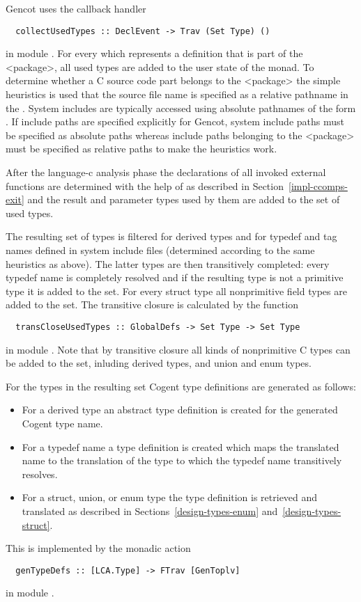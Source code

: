 Gencot uses the callback handler
\begin{verbatim}
  collectUsedTypes :: DeclEvent -> Trav (Set Type) ()
\end{verbatim}
in module . For every  which represents a definition that is
part of the <package>, all used types are added to the user state of the  monad. To determine whether
a C source code part belongs to the <package> the simple heuristics is used that the source file name is specified
as a relative pathname in the . System includes are typically accessed using absolute pathnames of the 
form . If include paths are specified explicitly for Gencot, system include paths must be 
specified as absolute paths whereas include paths belonging to the <package> must be specified as relative paths
to make the heuristics work.

After the language-c analysis phase the declarations of all invoked external functions are determined with the
help of  as described in Section~\ref{impl-ccomps-exit} and the result and parameter 
types used by them are added to the set of used types.

The resulting set of types is filtered for derived types and for typedef and tag names defined in system include files
(determined according to the same heuristics as above). The latter types are then transitively completed: every typedef 
name is completely resolved and if the resulting type is not a primitive type it is added to the set. For every struct
type all nonprimitive field types are added to the set. The transitive closure is calculated by the function
\begin{verbatim}
  transCloseUsedTypes :: GlobalDefs -> Set Type -> Set Type
\end{verbatim}
in module . Note that by transitive closure all kinds of nonprimitive C types can be added to
the set, inluding derived types, and union and enum types.

For the types in the resulting set Cogent type definitions are generated as follows:
\begin{itemize}
\item For a derived type an abstract type definition is created for the generated Cogent type name.
\item For a typedef name a type definition is created which maps the translated name to the translation of the type
to which the typedef name transitively resolves.
\item For a struct, union, or enum type the type definition is retrieved and translated as described in 
Sections~\ref{design-types-enum} and~\ref{design-types-struct}.
\end{itemize}
This is implemented by the monadic action
\begin{verbatim}
  genTypeDefs :: [LCA.Type] -> FTrav [GenToplv]
\end{verbatim}
in module .



